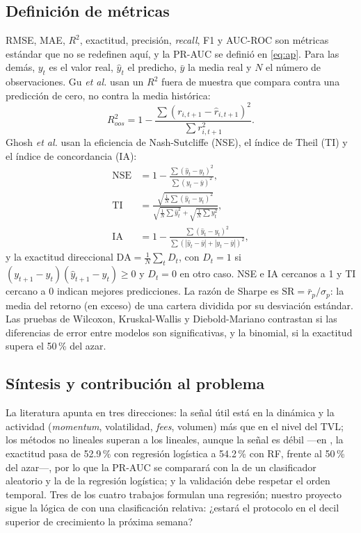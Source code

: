 \documentclass[letterpaper,journal]{IEEEtran}
\begin{document}
\subsection{Definición de métricas}
\label{sec:met}

RMSE, MAE, $R^2$, exactitud, precisión, \emph{recall}, F1 y AUC-ROC son
métricas estándar que no se redefinen aquí, y la \mbox{PR-AUC} se definió en
\eqref{eq:ap}. Para las demás, $y_t$ es el
valor real, $\hat{y}_t$ el predicho, $\bar{y}$ la media real y $N$ el número de
observaciones. Gu \emph{et al.} \cite{gukellyxiu2020} usan un $R^2$ fuera de
muestra que compara contra una predicción de cero, no contra la media histórica:
\begin{equation}
R^2_{oos} = 1 - \frac{\sum (r_{i,t+1} - \hat{r}_{i,t+1})^2}{\sum r_{i,t+1}^2}.
\label{eq:r2oos}
\end{equation}
Ghosh \emph{et al.} \cite{ghosh2023} usan la eficiencia de Nash-Sutcliffe (NSE),
el índice de Theil (TI) y el índice de concordancia (IA):
\begin{align}
\text{NSE} &= 1 - \frac{\sum (\hat{y}_t - y_t)^2}{\sum (y_t - \bar{y})^2}, \label{eq:nse}\\
\text{TI} &= \frac{\sqrt{\tfrac{1}{N}\sum (\hat{y}_t - y_t)^2}}{\sqrt{\tfrac{1}{N}\sum \hat{y}_t^2} + \sqrt{\tfrac{1}{N}\sum y_t^2}}, \label{eq:ti}\\
\text{IA} &= 1 - \frac{\sum (\hat{y}_t - y_t)^2}{\sum \left(|\hat{y}_t - \bar{y}| + |y_t - \bar{y}|\right)^2}, \label{eq:ia}
\end{align}
y la exactitud direccional $\text{DA} = \frac{1}{N}\sum_t D_t$, con $D_t = 1$ si
$(y_{t+1} - y_t)(\hat{y}_{t+1} - y_t) \geq 0$ y $D_t = 0$ en otro caso. NSE e IA
cercanos a 1 y TI cercano a 0 indican mejores predicciones. La razón de Sharpe
\cite{gukellyxiu2020,jaquart2022} es $\text{SR} = \bar{r}_p/\sigma_p$: la media
del retorno (en exceso) de una cartera dividida por su desviación estándar. Las
pruebas de Wilcoxon, Kruskal-Wallis y Diebold-Mariano contrastan si las
diferencias de error entre modelos son significativas, y la binomial, si la
exactitud supera el 50\,\% del azar.

\subsection{Síntesis y contribución al problema}

La literatura apunta en tres direcciones: la señal útil está en la dinámica y la
actividad (\emph{momentum}, volatilidad, \emph{fees}, volumen) más que en el
nivel del TVL; los métodos no lineales superan a los lineales, aunque la señal es
débil ---en \cite{jaquart2022}, la exactitud pasa de 52.9\,\% con regresión
logística a 54.2\,\% con RF, frente al 50\,\% del azar---, por lo que la \mbox{PR-AUC}
se comparará con la de un clasificador aleatorio y la de la regresión logística;
y la validación debe respetar el orden temporal. Tres de los cuatro trabajos
formulan una regresión; nuestro proyecto sigue la lógica de \cite{jaquart2022}
con una clasificación relativa: ¿estará el protocolo en el decil superior de
crecimiento la próxima semana?



\end{document}
